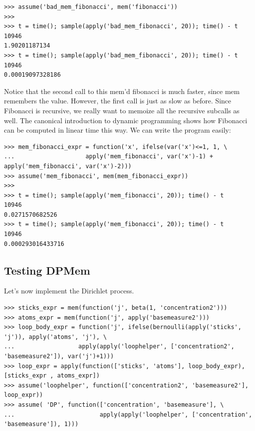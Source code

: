 \documentclass[11pt]{article}
\begin{document}
\begin{small}
\begin{verbatim}
>>> assume('bad_mem_fibonacci', mem('fibonacci'))
>>>
>>> t = time(); sample(apply('bad_mem_fibonacci', 20)); time() - t
10946
1.90201187134
>>> t = time(); sample(apply('bad_mem_fibonacci', 20)); time() - t
10946
0.00019097328186
\end{verbatim}
\end{small}

\noindent Notice that the second call to this mem'd fibonacci is much faster, since mem remembers the value.  However, the first call is just as slow as before.  Since Fibonacci is recursive, we really want to memoize all the recursive subcalls as well.  The canonical introduction to dynamic programming shows how Fibonacci can be computed in linear time this way.  We can write the program easily:

\begin{small}
\begin{verbatim}
>>> mem_fibonacci_expr = function('x', ifelse(var('x')<=1, 1, \
...                    apply('mem_fibonacci', var('x')-1) + apply('mem_fibonacci', var('x')-2)))
>>> assume('mem_fibonacci', mem(mem_fibonacci_expr))
>>>
>>> t = time(); sample(apply('mem_fibonacci', 20)); time() - t
10946
0.0271570682526
>>> t = time(); sample(apply('mem_fibonacci', 20)); time() - t
10946
0.000293016433716
\end{verbatim}
\end{small}

\subsection{Testing DPMem}

Let's now implement the Dirichlet process.  

\begin{small}
\begin{verbatim}
>>> sticks_expr = mem(function('j', beta(1, 'concentration2')))
>>> atoms_expr = mem(function('j', apply('basemeasure2')))
>>> loop_body_expr = function('j', ifelse(bernoulli(apply('sticks', 'j')), apply('atoms', 'j'), \
...                  apply(apply('loophelper', ['concentration2', 'basemeasure2']), var('j')+1)))
>>> loop_expr = apply(function(['sticks', 'atoms'], loop_body_expr), [sticks_expr , atoms_expr])
>>> assume('loophelper', function(['concentration2', 'basemeasure2'], loop_expr))
>>> assume( 'DP', function(['concentration', 'basemeasure'], \
...                        apply(apply('loophelper', ['concentration', 'basemeasure']), 1)))
\end{verbatim}
\end{small}
\end{document}

